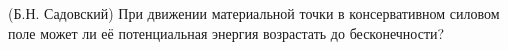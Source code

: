 (Б.Н. Садовский)
При движении материальной точки в консервативном силовом поле может
ли её потенциальная энергия возрастать до бесконечности?
